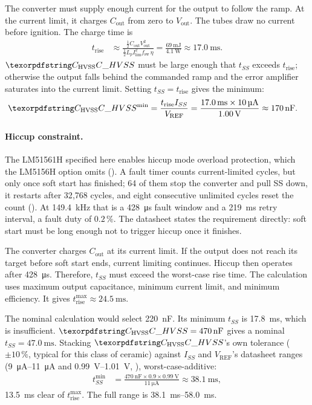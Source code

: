 The converter must supply enough current for the output to follow the ramp. At
the current limit, it charges $C_{\mathrm{out}}$ from zero to
$V_{\mathrm{out}}$. The tubes draw no current before ignition. The charge time
is
\begin{align*}
  t_{\mathrm{rise}} &\approx
  \frac{\tfrac{1}{2} C_{\mathrm{out}} V_{\mathrm{out}}^2}
       {\tfrac{1}{2} L_p I_{\mathrm{lim}}^2 f_{\mathrm{sw}}\,\eta}
  = \frac{\SI{69}{\milli\joule}}{\SI{4.1}{\watt}}
  \approx \SI{17.0}{\milli\second}.
\end{align*}
$\des{C}{HVSS}$ must be large enough that $t_{SS}$ exceeds $t_{\mathrm{rise}}$;
otherwise the output falls behind the commanded ramp and the error amplifier
saturates into the current limit. Setting $t_{SS} = t_{\mathrm{rise}}$ gives the
minimum:
\begin{align*}
  \des{C}{HVSS}^{\min} &= \frac{t_{\mathrm{rise}} I_{SS}}{V_{\mathrm{REF}}}
  = \frac{\SI{17.0}{\milli\second} \times \SI{10}{\micro\ampere}}{\SI{1.00}{\volt}}
  \approx \SI{170}{\nano\farad}.
\end{align*}
\paragraph{Hiccup constraint.}
The LM51561H specified here enables hiccup mode overload protection, which the
LM5156H option omits (). A fault timer counts current-limited
cycles, but only once soft start has finished; 64 of them stop the converter and
pull SS down, it restarts after 32{,}768 cycles, and eight consecutive
unlimited cycles reset the count (). At
\SI{149.4}{\kilo\hertz} that is a \SI{428}{\micro\second} fault window and a
\SI{219}{\milli\second} retry interval, a fault duty of $0.2\,\%$. The datasheet
states the requirement directly: soft start must be long enough not to trigger
hiccup once it finishes.

The converter charges $C_{\mathrm{out}}$ at its current limit. If the output
does not reach its target before soft start ends, current limiting continues.
Hiccup then operates after \SI{428}{\micro\second}. Therefore, $t_{SS}$ must
exceed the worst-case rise time. The calculation uses maximum output
capacitance, minimum current limit, and minimum efficiency. It gives
$t_{\mathrm{rise}}^{\max} \approx \SI{24.5}{\milli\second}$.

The nominal calculation would select \SI{220}{\nano\farad}. Its minimum
$t_{SS}$ is \SI{17.8}{\milli\second}, which is insufficient.
$\des{C}{HVSS} = \SI{470}{\nano\farad}$ gives a nominal
$t_{SS} = \SI{47.0}{\milli\second}$. Stacking
$\des{C}{HVSS}$'s own tolerance ($\pm10\,\%$, typical for this class of ceramic)
against $I_{SS}$ and $V_{\mathrm{REF}}$'s datasheet ranges
(\SIrange{9}{11}{\micro\ampere} and \SIrange{0.99}{1.01}{\volt},
), worst-case-additive:
\begin{align*}
  t_{SS}^{\min} &= \frac{\SI{470}{\nano\farad}\times0.9 \times \SI{0.99}{\volt}}
  {\SI{11}{\micro\ampere}} \approx \SI{38.1}{\milli\second},
\end{align*}
\SI{13.5}{\milli\second} clear of $t_{\mathrm{rise}}^{\max}$. The full range is
\SIrange{38.1}{58.0}{\milli\second}.

